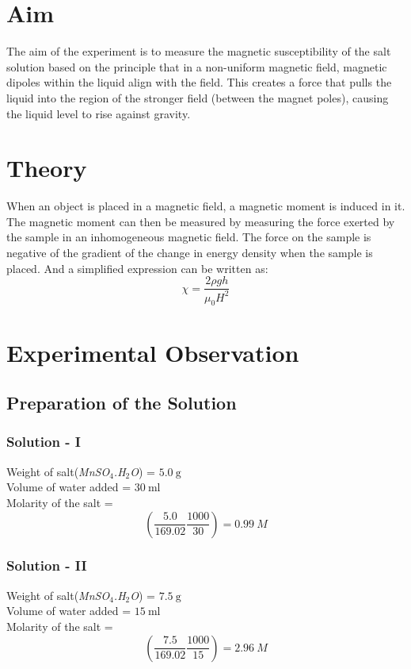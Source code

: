 \documentclass[../main.tex]{subfiles}
\begin{document}


\setcounter{page}{1}

\vspace*{1cm}
\section{Aim}
The aim of the experiment is to measure the magnetic susceptibility of the salt solution based on the principle that in a non-uniform magnetic field, magnetic dipoles within the liquid align with the field. This creates a force that pulls the liquid into the region of the stronger field (between the magnet poles), causing the liquid level to rise against gravity.

\section{Theory}
When an object is placed in a magnetic field, a magnetic moment is induced in it. The magnetic moment can then be measured by measuring the force exerted by the sample in an inhomogeneous magnetic field. The force on the sample is  negative of the gradient of the change in energy density when the sample is placed. And a simplified expression can be written as:
$$ \chi = \frac{2 \rho g h}{\mu_0 H^2} $$

\section{Experimental Observation}
\subsection{Preparation of the Solution}
\subsubsection*{Solution - I}
\noindent Weight of salt(\textit{MnSO$_4$.H$_2$O}) = $\SI{5.0}{\gram}$ \\ 
Volume of water added = $\SI{30}{\milli\litre}$ \\ 
Molarity of the salt = 
$$\left(\frac{5.0}{169.02} \frac{1000}{30}\right) = \SI{0.99}{M}$$ 

\subsubsection*{Solution - II}
\noindent Weight of salt(\textit{MnSO$_4$.H$_2$O}) = $\SI{7.5}{\gram}$ \\ 
Volume of water added = $\SI{15}{\milli\litre}$ \\ 
Molarity of the salt = 
$$\left(\frac{7.5}{169.02} \frac{1000}{15}\right) = \SI{2.96}{M}$$ 
\end{document}
